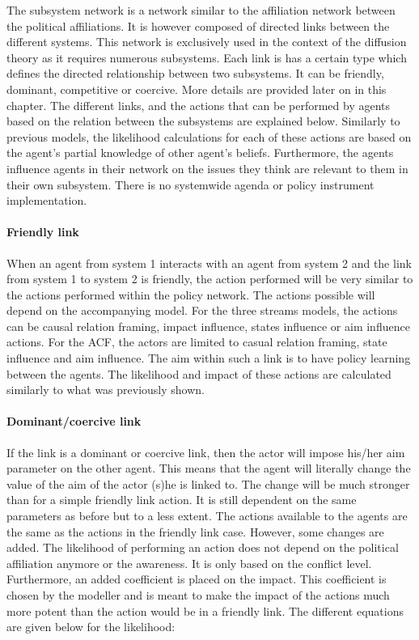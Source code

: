 The subsystem network is a network similar to the affiliation network between the political affiliations. It is however composed of directed links between the different systems. This network is exclusively used in the context of the diffusion theory as it requires numerous subsystems. Each link is has a certain type which defines the directed relationship between two subsystems. It can be friendly, dominant, competitive or coercive. More details are provided later on in this chapter. The different links, and the actions that can be performed by agents based on the relation between the subsystems are explained below. Similarly to previous models, the likelihood calculations for each of these actions are based on the agent’s partial knowledge of other agent’s beliefs. Furthermore, the agents influence agents in their network on the issues they think are relevant to them in their own subsystem. There is no systemwide agenda or policy instrument implementation.

\paragraph{Friendly link}

When an agent from system 1 interacts with an agent from system 2 and the link from system 1 to system 2 is friendly, the action performed will be very similar to the actions performed within the policy network. The actions possible will depend on the accompanying model. For the three streams models, the actions can be causal relation framing, impact influence, states influence or aim influence actions. For the ACF, the actors are limited to casual relation framing, state influence and aim influence. The aim within such a link is to have policy learning between the agents. The likelihood and impact of these actions are calculated similarly to what was previously shown.

\paragraph{Dominant/coercive link}

If the link is a dominant or coercive link, then the actor will impose his/her aim parameter on the other agent. This means that the agent will literally change the value of the aim of the actor (s)he is linked to. The change will be much stronger than for a simple friendly link action. It is still dependent on the same parameters as before but to a less extent. The actions available to the agents are the same as the actions in the friendly link case. However, some changes are added. The likelihood of performing an action does not depend on the political affiliation anymore or the awareness. It is only based on the conflict level. Furthermore, an added coefficient is placed on the impact. This coefficient is chosen by the modeller and is meant to make the impact of the actions much more potent than the action would be in a friendly link. The different equations are given below for the likelihood:

